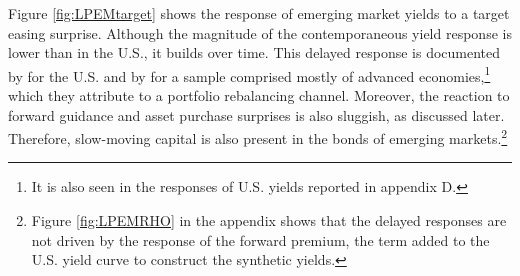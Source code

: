 {%
Figure \ref{fig:LPEMtarget} shows the response of emerging market yields to a target easing surprise.
Although the magnitude of the contemporaneous yield response %
is lower than in the U.S., it builds over time.
This delayed response is documented by \cite{BrooksKatzLustig:2019} for the U.S. and by \cite{ACDM:2019} for a sample comprised mostly of advanced economies,\footnote{ It is also seen in the responses of U.S. yields reported in appendix D.} which they attribute to a portfolio rebalancing channel.
Moreover, the reaction to forward guidance and asset purchase surprises is also sluggish, as discussed later.
Therefore, slow-moving capital is also present in the bonds of emerging markets.\footnote{ Figure \ref{fig:LPEMRHO} in the appendix shows that the delayed responses are not driven by the response of the forward premium, the term added to the U.S. yield curve to construct the synthetic yields.} %

}
